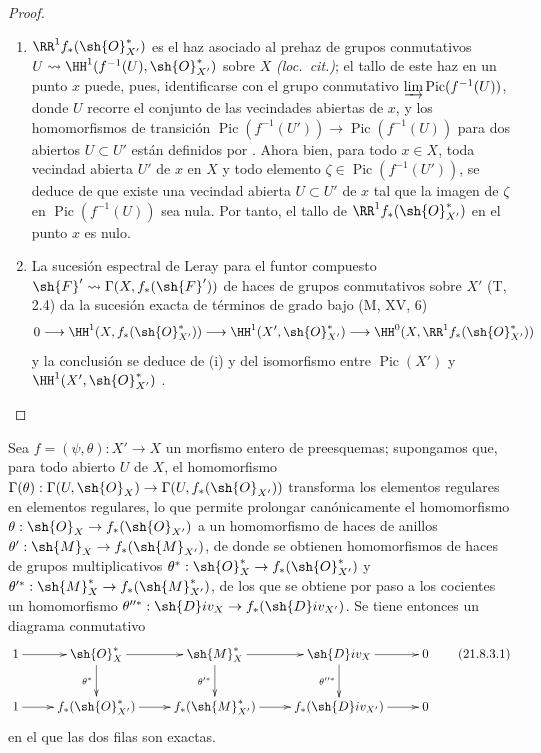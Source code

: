 \begin{proof}
\begin{enumerate}[label=(\roman*)]
  \item $\RR^1 f_*(\sh{O}^*_{X'})$ es el haz asociado al prehaz de grupos conmutativos $U\leadsto\HH^1(f^{-1}(U),\sh{O}^*_{X'})$ sobre $X$ \emph{(loc.\ cit.)};
el tallo de este haz en un punto $x$ puede, pues, identificarse  con el grupo conmutativo $\varinjlim\operatorname{Pic}(f^{-1}(U))$, donde $U$ recorre el conjunto de las vecindades abiertas de $x$, y los homomorfismos de transición $\operatorname{Pic}(f^{-1}(U'))\to\operatorname{Pic}(f^{-1}(U))$ para dos abiertos $U\subset U'$ están definidos por .
Ahora bien, para todo $x\in X$, toda vecindad abierta $U'$ de $x$ en $X$ y todo elemento $\zeta\in\operatorname{Pic}(f^{-1}(U'))$, se deduce de  que existe una vecindad abierta $U\subset U'$ de $x$ tal que la imagen de $\zeta$ en $\operatorname{Pic}(f^{-1}(U))$ sea nula.
Por tanto, el tallo de $\RR^1f_*(\sh{O}^*_{X'})$ en el punto $x$ es nulo.

  \item La sucesión espectral de Leray para el funtor compuesto $\sh{F}'\leadsto\Gamma(X,f_*(\sh{F}'))$ de haces de grupos conmutativos sobre $X'$ (T, 2.4) da la sucesión exacta de términos de grado bajo (M, XV, 6)
\[
  0\to\HH^1(X,f_*(\sh{O}^*_{X'}))\to\HH^1(X',\sh{O}^*_{X'})\to\HH^0(X,\RR^1f_*(\sh{O}^*_{X'}))
\]
y la conclusión se deduce de (i) y del isomorfismo entre $\operatorname{Pic}(X')$ y $\HH^1(X',\sh{O}^*_{X'})$ .
\end{enumerate}
\end{proof}

\begin{proposition}[21.8.3]
\label{IV.21.8.3}
Sea $f=(\psi,\theta):X'\to X$ un morfismo entero de preesquemas;
supongamos que, para todo abierto $U$ de $X$, el homomorfismo $\Gamma(\theta):\Gamma(U,\sh{O}_X)\to\Gamma(U,f_*(\sh{O}_{X'}))$ transforma los elementos regulares en elementos regulares, lo que permite prolongar canónicamente el homomorfismo $\theta:\sh{O}_X\to f_*(\sh{O}_{X'})$ a un homomorfismo de haces de anillos $\theta':\sh{M}_X\to f_*(\sh{M}_{X'})$, de donde se obtienen homomorfismos de haces de grupos multiplicativos $\theta^*:\sh{O}^*_X\to f_*(\sh{O}^*_{X'})$ y $\theta'^*:\sh{M}^*_X\to f_*(\sh{M}^*_{X'})$, de los que se obtiene por paso a los cocientes un homomorfismo $\theta''^*:\sh{D}iv_X\to f_*(\sh{D}iv_{X'})$.
Se tiene entonces un diagrama conmutativo
\[
\label{IV.21.8.3.1}
  \xymatrix{
    1 \ar[r] & \sh{O}^*_X \ar[r] \ar[d]_{\theta^*} & \sh{M}^*_X \ar[r] \ar[d]_{\theta'^*} & \sh{D}iv_X \ar[r] \ar[d]_{\theta''^*} & 0\\
    1 \ar[r] & f_*(\sh{O}^*_{X'}) \ar[r] & f_*(\sh{M}^*_{X'}) \ar[r] & f_*(\sh{D}iv_{X'}) \ar[r] & 0
  }
  \tag{21.8.3.1}
\]
en el que las dos filas son exactas.
\end{proposition}


